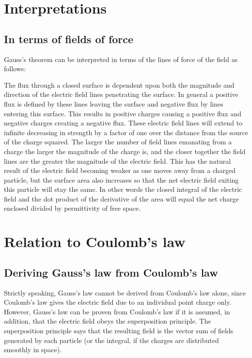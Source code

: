 \documentclass[a4paper, 12pt]{article}
\begin{document}
\section{Interpretations}
\subsection{In terms of fields of force}
Gauss's theorem can be interpreted in terms of the lines of force of the field as follows:

The flux through a closed surface is dependent upon both the magnitude and direction of the electric field lines penetrating the surface. In general a positive flux is defined by these lines leaving the surface and negative flux by lines entering this surface. This results in positive charges causing a positive flux and negative charges creating a negative flux. These electric field lines will extend to infinite decreasing in strength by a factor of one over the distance from the source of the charge squared. The larger the number of field lines emanating from a charge the larger the magnitude of the charge is, and the closer together the field lines are the greater the magnitude of the electric field. This has the natural result of the electric field becoming weaker as one moves away from a charged particle, but the surface area also increases so that the net electric field exiting this particle will stay the same. In other words the closed integral of the electric field and the dot product of the derivative of the area will equal the net charge enclosed divided by permittivity of free space. 

\section{Relation to Coulomb's law}
\subsection{Deriving Gauss's law from Coulomb's law}
Strictly speaking, Gauss's law cannot be derived from Coulomb's law alone, since Coulomb's law gives the electric field due to an individual point charge only. However, Gauss's law can be proven from Coulomb's law if it is assumed, in addition, that the electric field obeys the superposition principle. The superposition principle says that the resulting field is the vector sum of fields generated by each particle (or the integral, if the charges are distributed smoothly in space). 
\end{document}

